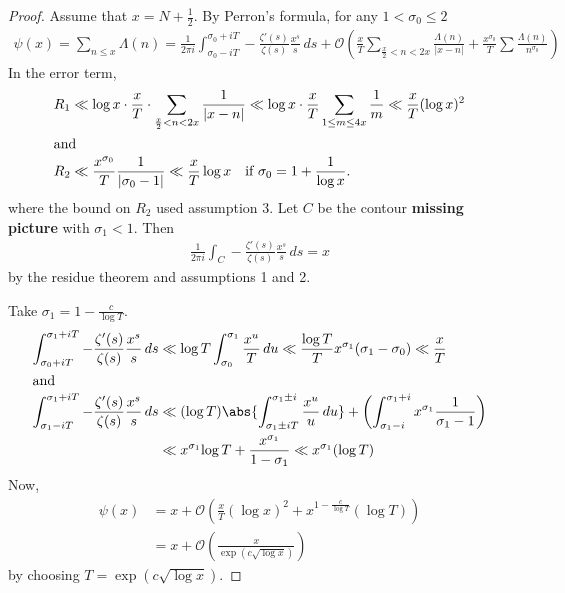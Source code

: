 \documentclass{article}
\newcommand{\1}{\mathbbm{1}}
\newcommand{\bigO}{\mathcal{O}}
\begin{document}
\begin{proof}
  Assume that $x = N + \frac{1}{2}$.
  By Perron's formula, for any $1 < \sigma_0 \leq 2$
  \begin{align*}
    \psi(x) = \sum_{n \leq x} \Lambda(n) = \frac{1}{2\pi i} \int_{\sigma_0-iT}^{\sigma_0+iT} -\frac{\zeta'(s)}{\zeta(s)} \frac{x^s}{s}\,ds + \bigO\left(\frac{x}{T} \sum_{\frac{x}{2}<n<2x} \frac{\Lambda(n)}{|x-n|} + \frac{x^{\sigma_0}}{T} \sum \frac{\Lambda(n)}{n^{\sigma_0}}\right)
  \end{align*}
  In the error term,
  \begin{align*}
    R_1 &\ll \log x \cdot \frac{x}{T} \cdot \sum_{\frac{x}{2} < n < 2x} \frac{1}{|x-n|} \ll \log x \cdot \frac{x}{T} \sum_{1 \leq m \leq 4x} \frac{1}{m} \ll \frac{x}{T} (\log x)^2 \\
    \shortintertext{and}
    R_2 &\ll \frac{x^{\sigma_0}}{T} \frac{1}{|\sigma_0-1|} \ll \frac{x}{T} \log x \quad \text{if } \sigma_0 = 1 + \frac{1}{\log x}.
  \end{align*}
  where the bound on $R_2$ used assumption 3.
  Let $C$ be the contour
  \textbf{missing picture}
  with $\sigma_1 < 1$.
  Then
  \begin{align*}
    \frac{1}{2\pi i} \int_C -\frac{\zeta'(s)}{\zeta(s)} \frac{x^s}{s}\,ds=x
  \end{align*}
  by the residue theorem and assumptions 1 and 2.

  Take $\sigma_1 = 1 - \frac{c}{\log T}$.
  \begin{align*}
    \int_{\sigma_0+iT}^{\sigma_1+iT} -\frac{\zeta'(s)}{\zeta(s)} \frac{x^s}{s}\,ds &\ll \log T \int_{\sigma_0}^{\sigma_1} \frac{x^u}{T}\,du \ll \frac{\log T}{T} x^{\sigma_1}(\sigma_1 - \sigma_0) \ll \frac{x}{T} \\
    \shortintertext{and}
    \int_{\sigma_1-iT}^{\sigma_1+iT} -\frac{\zeta'(s)}{\zeta(s)} \frac{x^s}{s}\,ds &\ll (\log T) \abs{\int_{\sigma_1\pm iT}^{\sigma_1\pm i} \frac{x^u}{u}\,du} + \left(\int_{\sigma_1-i}^{\sigma_1+i} x^{\sigma_1}\frac{1}{\sigma_1-1}\right) \\&\ll x^{\sigma_1}{\log T} + \frac{x^{\sigma_1}}{1-\sigma_1} \ll x^{\sigma_1} (\log T)
  \end{align*}
  Now,
  \begin{align*}
    \psi(x) &= x + \bigO\left(\frac{x}{T}(\log x)^2 + x^{1 - \frac{c}{\log T}}(\log T)\right) \\
            &= x + \bigO\left(\frac{x}{\exp(c \sqrt{\log x})}\right)
  \end{align*}
  by choosing $T = \exp(c \sqrt{\log x})$.
\end{proof}
\end{document}
